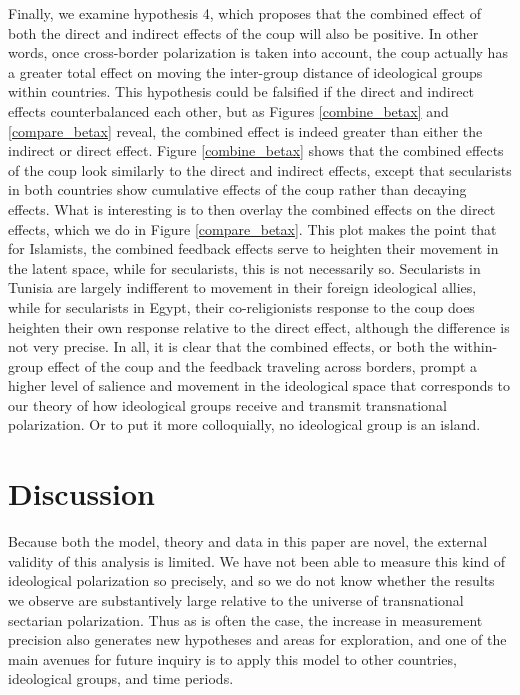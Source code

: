 \documentclass[12pt]{article}
\begin{document}
Finally, we examine hypothesis 4, which proposes that the combined effect of both the direct and indirect effects of the coup will also be positive. In other words, once cross-border polarization is taken into account, the coup actually has a greater total effect on moving the inter-group distance of ideological groups within countries. This hypothesis could be falsified if the direct and indirect effects counterbalanced each other, but as Figures \ref{combine_betax} and \ref{compare_betax} reveal, the combined effect is indeed greater than either the indirect or direct effect. Figure \ref{combine_betax} shows that the combined effects of the coup look similarly to the direct and indirect effects, except that secularists in both countries show cumulative effects of the coup rather than decaying effects. What is interesting is to then overlay the combined effects on the direct effects, which we do in Figure \ref{compare_betax}. This plot makes the point that for Islamists, the combined feedback effects serve to heighten their movement in the latent space, while for secularists, this is not necessarily so. Secularists in Tunisia are largely indifferent to movement in their foreign ideological allies, while for secularists in Egypt, their co-religionists response to the coup does heighten their own response relative to the direct effect, although the difference is not very precise. In all, it is clear that the combined effects, or both the within-group effect of the coup and the feedback traveling across borders, prompt a higher level of salience and movement in the ideological space that corresponds to our theory of how ideological groups receive and transmit transnational polarization. Or to put it more colloquially, no ideological group is an island.


\section*{Discussion}

Because both the model, theory and data in this paper are novel, the external validity of this analysis is limited. We have not been able to measure this kind of ideological polarization so precisely, and so we do not know whether the results we observe are substantively large relative to the universe of transnational sectarian polarization. Thus as is often the case, the increase in measurement precision also generates new hypotheses and areas for exploration, and one of the main avenues for future inquiry is to apply this model to other countries, ideological groups, and time periods. 
\end{document}
